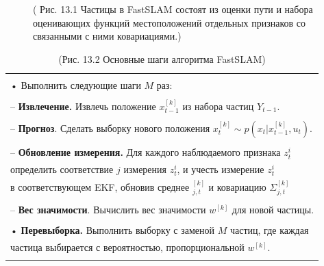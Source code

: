 \documentclass[10pt,a4paper]{article}
\begin{document}
\begin{figure}[H]
	\caption{ ( Рис. 13.1 Частицы в FastSLAM состоят из оценки пути и набора оценивающих функций местоположений отдельных признаков со связанными с ними ковариациями.) }
	\label{fig:131orig}
\end{figure}

\begin{table}[H]
\begin{center}
\begin{tabular}{|l|}
\hline
{}\\
•	Выполнить следующие шаги $M$ раз:\\
{}\\
\hspace{3mm}–   \textbf{Извлечение.} Извлечь положение $x_{t-1}^{[k]}$   из набора частиц  $Y_{t-1}$.\\
{}\\
\hspace{3mm}–   \textbf{Прогноз}. Сделать выборку нового положения $x_t^{[k]}\sim p(x_t|x_{t-1}^{[k]},u_t)$.\\
{}\\
\hspace{3mm}–  \textbf{ Обновление измерения.}  Для каждого наблюдаемого признака $z_t^i$ \\
\hspace{8mm}определить соответствие $j$ измерения $z_t^i$, и учесть измерение $z_t^i$\\
\hspace{7mm}  в соответствующем EKF, обновив среднее $_{j,t}^{[k]}$  и ковариацию $\varSigma_{j,t}^{[k]}$\\
{}\\
\hspace{3mm}–   \textbf{Вес значимости}.  Вычислить вес значимости $w^{[k]}$ для новой частицы.\\
{}\\
•	\textbf{Перевыборка.} Выполнить выборку с заменой $M$ частиц, где каждая \\
\hspace{3mm}частица выбирается с вероятностью, пропорциональной $w^{[k]}$.\\
{}\\
\hline
\end{tabular}
\caption{(Рис. 13.2    Основные шаги алгоритма FastSLAM)}
\end{center}
\end{table}
\end{document}

